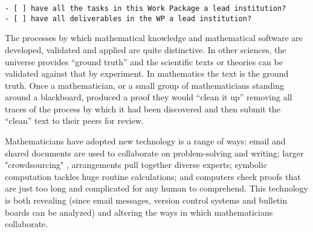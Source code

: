 \begin{draft}
\begin{verbatim}
- [ ] have all the tasks in this Work Package a lead institution?
- [ ] have all deliverables in the WP a lead institution?
\end{verbatim}
\end{draft}



\begin{workpackage}[id=social-aspects,wphases=0-48,
  title=Social Aspects,
  lead=UO,
  UORM=53,USHRM=8, USORM=5]


\begin{wpobjectives}

The processes by which mathematical knowledge and mathematical
software are developed, validated and applied are quite
distinctive. In other sciences, the universe provides ``ground truth''
and the scientific texts or theories can be validated against that by
experiment. In mathematics the text is the ground truth. Once 
 a mathematician, or a small group of
mathematicians standing around a blackboard, produced a proof they
would ``clean it up'' removing all traces of the process by which it
had been discovered and then submit the ``clean'' text to their peers
for review. 

Mathematicians have adopted new technology is a range of ways: email
and shared documents are used to collaborate on problem-solving and
writing; larger "crowdsourcing" \cite{polymath_SIAM, PolymathBlog}, arrangements
pull together diverse  experts; symbolic computation tackles huge routine
calculations; and computers  check  proofs that are just too long and 
complicated for any human to comprehend. This technology is both
revealing (since email messages, version control systems and bulletin
boards can be analyzed) and altering the ways in which mathematicians
collaborate. 


\end{wpobjectives}
\end{workpackage}

